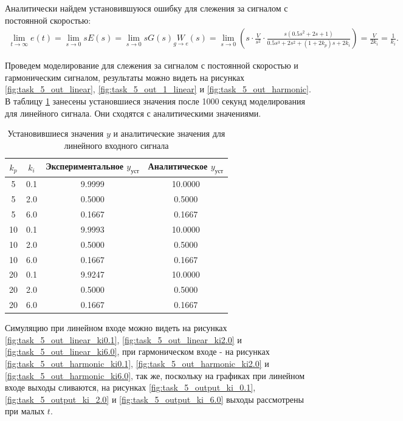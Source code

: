 Аналитически найдем установившуюся ошибку для слежения за сигналом с постоянной скоростью:
\begin{multline*}
    \lim_{t\rightarrow\infty}e(t)
    =\lim_{s\rightarrow0}sE(s)=\lim_{s\rightarrow0}sG(s)\underset{g\rightarrow e}{W}(s)
    =\lim_{s\rightarrow0}\left(s\cdot\frac{V}{s^2}\cdot\frac{s(0.5s^2+2s+1)}{0.5s^3+2s^2+(1+2k_p)s+2k_i}\right)
    =\frac{V}{2k_i}=\frac{1}{k_i}.
\end{multline*}

Проведем моделирование для слежения за сигналом с постоянной скоростью и гармоническим
сигналом, результаты можно видеть на рисунках \ref{fig:task_5_out_linear}, \ref{fig:task_5_out_1_linear} и \ref{fig:task_5_out_harmonic}.
В таблицу \ref{tab:task_5_out} занесены установшиеся значения после 1000 секунд
моделирования для линейного сигнала. Они сходятся с аналитическими значениями.

\begin{table}[H]
    \centering
    \caption{Установившиеся значения $y$ и аналитические значения для линейного входного сигнала}
    \begin{tabular}{|c|c|c|c|}
        \hline
        $k_p$ & $k_i$ & Экспериментальное $y_{\text{уст}}$ & Аналитическое $y_{\text{уст}}$\\ \hline
        5 & 0.1 & 9.9999 & 10.0000 \\
        5 & 2.0 & 0.5000 & 0.5000 \\
        5 & 6.0 & 0.1667 & 0.1667 \\
        10 & 0.1 & 9.9993 & 10.0000 \\
        10 & 2.0 & 0.5000 & 0.5000 \\
        10 & 6.0 & 0.1667 & 0.1667 \\
        20 & 0.1 & 9.9247 & 10.0000 \\
        20 & 2.0 & 0.5000 & 0.5000 \\
        20 & 6.0 & 0.1667 & 0.1667 \\ \hline
    \end{tabular}
    \label{tab:task_5_out}
\end{table}

Симуляцию при линейном входе можно видеть на рисунках \ref{fig:task_5_out_linear_ki0.1}, \ref{fig:task_5_out_linear_ki2.0} и \ref{fig:task_5_out_linear_ki6.0},
при гармоническом входе - на рисунках \ref{fig:task_5_out_harmonic_ki0.1}, \ref{fig:task_5_out_harmonic_ki2.0} и \ref{fig:task_5_out_harmonic_ki6.0},
так же, поскольку на графиках при линейном входе выходы сливаются, на рисунках \ref{fig:task_5_output_ki_0.1}, \ref{fig:task_5_output_ki_2.0} и \ref{fig:task_5_output_ki_6.0}
выходы рассмотрены при малых $t$.

